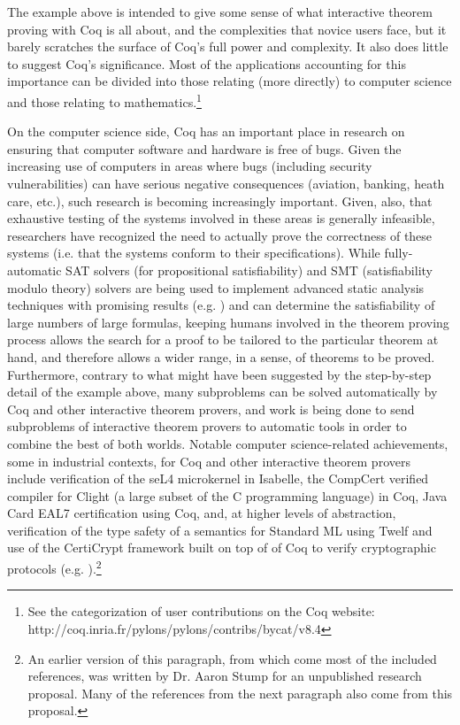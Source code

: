 \documentclass[11pt]{amsart}
\begin{document}
The example above is intended to give some sense of what interactive theorem proving with Coq is all about, and the complexities that novice users face, but it barely scratches the surface of Coq's full power and complexity.  It also does little to suggest Coq's significance.    Most of the applications accounting for this importance can be divided into those relating (more directly) to computer science and those relating to mathematics.\footnote{See the categorization of user contributions on the Coq website:  http://coq.inria.fr/pylons/pylons/contribs/bycat/v8.4}

On the computer science side, Coq has an important place in research on ensuring that computer software and hardware is free of bugs.  Given the increasing use of computers in areas where bugs (including security vulnerabilities) can have serious negative consequences (aviation, banking, heath care, etc.), such research is becoming increasingly important.  Given, also, that exhaustive testing of the systems involved in these areas is generally infeasible, researchers have recognized the need to actually prove the correctness of these systems (i.e. that the systems conform to their specifications). While fully-automatic SAT solvers (for propositional satisfiability) and SMT (satisfiability modulo theory) solvers are being used to implement advanced static analysis techniques with promising results (e.g. \cite{gulwani2008program,dillig2011small}) and can determine the satisfiability of large numbers of large formulas, keeping humans involved in the theorem proving process allows the search for a proof to be tailored to the particular theorem at hand, and therefore allows a wider range, in a sense, of theorems to be proved.  Furthermore, contrary to what might have been suggested by the step-by-step detail of the example above, many subproblems can be solved automatically by Coq and other interactive theorem provers, and work is being done to send subproblems of interactive theorem provers to automatic tools \cite{bohme2010sledgehammer} in order to combine the best of both worlds.  Notable computer science-related achievements, some in industrial contexts, for Coq and other interactive theorem provers include verification of the seL4 microkernel \cite{klein2010sel4} in Isabelle\cite{Isabelle}, the CompCert verified compiler\cite{leroy2009formal} for Clight (a large subset of the C programming language) in Coq, Java Card EAL7 certification\cite{gemaltogemalto} using Coq, and, at higher levels of abstraction, verification of the type safety of a semantics for Standard ML \cite{lee2007towards} using Twelf\cite{Twelf} and use of the CertiCrypt framework \cite{CertiCrypt} built on top of of Coq to verify cryptographic protocols (e.g. \cite{barthe2010machine}).\footnote{An earlier version of this paragraph, from which come most of the included references, was written by Dr. Aaron Stump for an unpublished research proposal.  Many of the references from the next paragraph also come from this proposal.}
\end{document}

